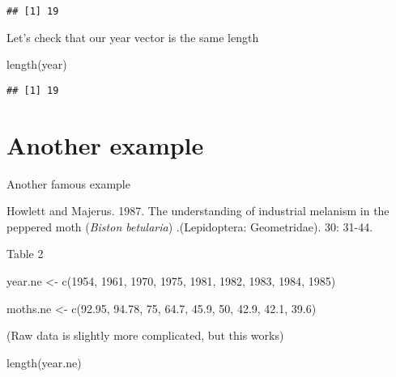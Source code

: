 \documentclass[
]{book}
\newenvironment{Shaded}{\begin{snugshade}}{\end{snugshade}}
\newcommand{\DecValTok}[1]{\textcolor[rgb]{0.00,0.00,0.81}{#1}}
\newcommand{\FloatTok}[1]{\textcolor[rgb]{0.00,0.00,0.81}{#1}}
\newcommand{\FunctionTok}[1]{\textcolor[rgb]{0.00,0.00,0.00}{#1}}
\newcommand{\NormalTok}[1]{#1}
\newcommand{\OtherTok}[1]{\textcolor[rgb]{0.56,0.35,0.01}{#1}}
\begin{document}
\begin{verbatim}
## [1] 19
\end{verbatim}

Let's check that our year vector is the same length

\begin{Shaded}
\begin{Highlighting}[]
\FunctionTok{length}\NormalTok{(year)}
\end{Highlighting}
\end{Shaded}

\begin{verbatim}
## [1] 19
\end{verbatim}

\hypertarget{another-example}{%
\section{Another example}\label{another-example}}

Another famous example

Howlett and Majerus. 1987. The understanding of industrial melanism in the peppered moth (\emph{Biston betularia}) .(Lepidoptera: Geometridae). 30: 31-44.

Table 2

\begin{Shaded}
\begin{Highlighting}[]
\NormalTok{year.ne }\OtherTok{\textless{}{-}} \FunctionTok{c}\NormalTok{(}\DecValTok{1954}\NormalTok{, }\DecValTok{1961}\NormalTok{, }\DecValTok{1970}\NormalTok{, }\DecValTok{1975}\NormalTok{, }\DecValTok{1981}\NormalTok{, }\DecValTok{1982}\NormalTok{, }\DecValTok{1983}\NormalTok{, }\DecValTok{1984}\NormalTok{, }\DecValTok{1985}\NormalTok{)}

\NormalTok{moths.ne }\OtherTok{\textless{}{-}} \FunctionTok{c}\NormalTok{(}\FloatTok{92.95}\NormalTok{, }\FloatTok{94.78}\NormalTok{, }\DecValTok{75}\NormalTok{, }\FloatTok{64.7}\NormalTok{, }\FloatTok{45.9}\NormalTok{, }\DecValTok{50}\NormalTok{, }\FloatTok{42.9}\NormalTok{, }\FloatTok{42.1}\NormalTok{, }\FloatTok{39.6}\NormalTok{)}
\end{Highlighting}
\end{Shaded}

(Raw data is slightly more complicated, but this works)

\begin{Shaded}
\begin{Highlighting}[]
\FunctionTok{length}\NormalTok{(year.ne)}
\end{Highlighting}
\end{Shaded}
\end{document}
